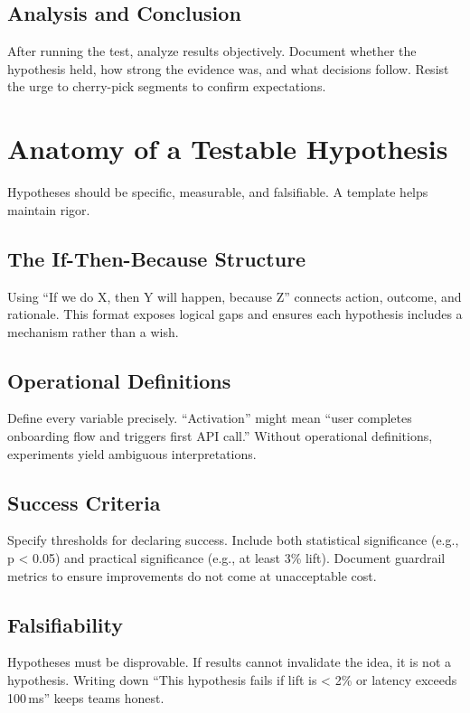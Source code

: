 \subsection{Analysis and Conclusion}
After running the test, analyze results objectively. Document whether the hypothesis held, how strong the evidence was, and what decisions follow. Resist the urge to cherry-pick segments to confirm expectations.

\section{Anatomy of a Testable Hypothesis}
\label{sec:hypothesis-anatomy}

Hypotheses should be specific, measurable, and falsifiable. A template helps maintain rigor.

\subsection{The If-Then-Because Structure}
Using ``If we do X, then Y will happen, because Z'' connects action, outcome, and rationale. This format exposes logical gaps and ensures each hypothesis includes a mechanism rather than a wish.

\subsection{Operational Definitions}
Define every variable precisely. ``Activation'' might mean ``user completes onboarding flow and triggers first API call.'' Without operational definitions, experiments yield ambiguous interpretations.

\subsection{Success Criteria}
Specify thresholds for declaring success. Include both statistical significance (e.g., p \textless{} 0.05) and practical significance (e.g., at least 3\% lift). Document guardrail metrics to ensure improvements do not come at unacceptable cost.

\subsection{Falsifiability}
Hypotheses must be disprovable. If results cannot invalidate the idea, it is not a hypothesis. Writing down ``This hypothesis fails if lift is \textless{} 2\% or latency exceeds 100\,ms'' keeps teams honest.

